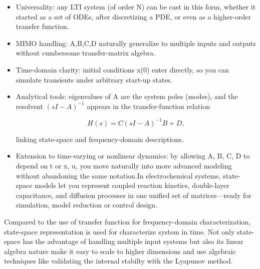 \begin{itemize}
    \item  Universality: any LTI system (of order N) can be cast in this form, whether it started as a set of ODEs, after discretizing a PDE, or even as a higher-order transfer function.
    \item  MIMO handling: A,B,C,D naturally generalize to multiple inputs and outputs without cumbersome transfer-matrix algebra.
    \item Time-domain clarity: initial conditions x(0) enter directly, so you can simulate transients under arbitrary start-up states.
    \item Analytical tools: eigenvalues of A are the system poles (modes), and the resolvent $(sI-A)^{-1}$ appears in the transfer-function relation
    
    \begin{equation*}
        H(s) = C (sI-A)^{-1}B+D,
    \end{equation*}

    linking state-space and frequency-domain descriptions.
    \item Extension to time-varying or nonlinear dynamics: by allowing A, B, C, D to depend on t or x, u, you move naturally into more advanced modeling without abandoning the same notation.In electrochemical systems, state-space models let you represent coupled reaction kinetics, double-layer capacitance, and diffusion processes in one unified set of matrices—ready for simulation, model reduction or control design. 
\end{itemize}

Compared to the use of transfer function for frequency-domain characterization, state-space representation is used for characterize system in time. Not only state-space has the advantage of handling multiple input systems but also its linear algebra nature make it easy to scale to higher dimensions and use algebraic techniques like validating the internal stabilty with the Lyapunov method.

